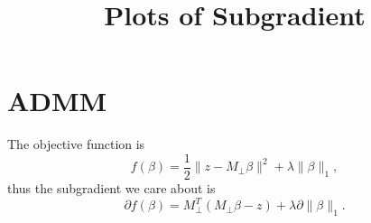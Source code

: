 \documentclass{article}
\title{Plots of Subgradient}
\begin{document}
\maketitle
\section{ADMM}
The objective function is
\begin{equation}
    f(\beta) = \frac{1}{2}\|z-M_{\perp}\beta\|^2 + \lambda\|\beta\|_1,
\end{equation}
thus the subgradient we care about is
\begin{equation}
    \partial f(\beta) = M_{\perp}^T(M_{\perp}\beta-z) + \lambda \partial \|\beta\|_1.
\end{equation}

\begin{figure}[H]
	\centering
\end{figure}
\end{document}
